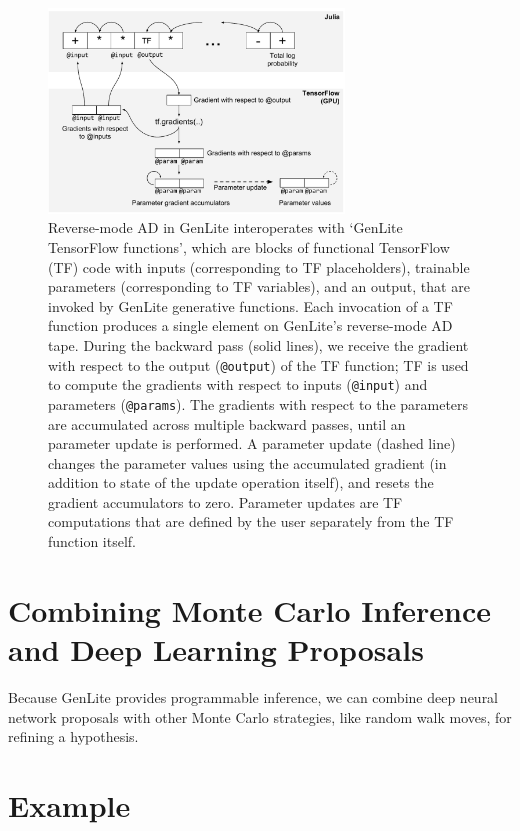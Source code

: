 \documentclass{article}
\begin{document}
\begin{figure}[h]
\centering
    \includegraphics[width=0.7\textwidth]{images/tf-integration-schematic.pdf}
    \caption{
Reverse-mode AD in GenLite interoperates with `GenLite TensorFlow functions', which are blocks of functional TensorFlow (TF) code with inputs (corresponding to TF placeholders), trainable parameters (corresponding to TF variables), and an output, that are invoked by GenLite generative functions.
Each invocation of a TF function produces a single element on GenLite's reverse-mode AD tape.
During the backward pass (solid lines), we receive the gradient with respect to the output (\texttt{@output}) of the TF function; TF is used to compute the gradients with respect to inputs (\texttt{@input}) and parameters (\texttt{@params}).
The gradients with respect to the parameters are accumulated across multiple backward passes, until an parameter update is performed.
A parameter update (dashed line) changes the parameter values using the accumulated gradient (in addition to state of the update operation itself), and resets the gradient accumulators to zero.
Parameter updates are TF computations that are defined by the user separately from the TF function itself.
}
    \label{fig:tf-integration-schematic}
\end{figure}

\section{Combining Monte Carlo Inference and Deep Learning Proposals}
Because GenLite provides programmable inference, we can combine deep neural network proposals with other Monte Carlo strategies, like random walk moves, for refining a hypothesis.





\section{Example}
\end{document}
